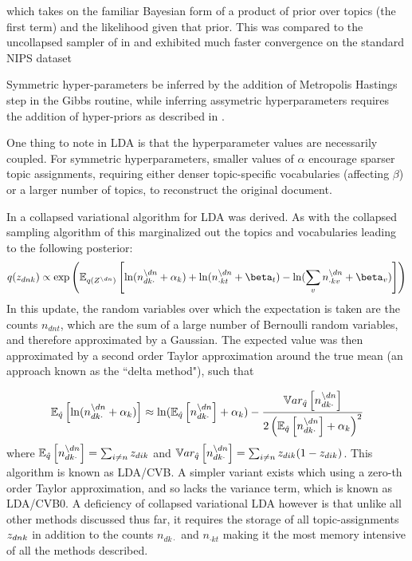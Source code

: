 which takes on the familiar Bayesian form of a product of prior over topics (the first term) and the likelihood given that prior. This was compared to the uncollapsed sampler of \cite{Pritchard2000} in and exhibited much faster convergence on the standard NIPS dataset

Symmetric hyper-parameters be inferred by the addition of Metropolis Hastings step in the Gibbs routine, while inferring assymetric hyperparameters requires the addition of hyper-priors as described in \cite{Wallach2009a}. 

One thing to note in LDA is that the hyperparameter values are necessarily coupled. For symmetric hyperparameters, smaller values of $\alpha$ encourage sparser topic assignments, requiring either denser topic-specific vocabularies (affecting $\beta$) or a larger number of topics, to reconstruct the original document.

In \cite{Teh2007} a collapsed variational algorithm for LDA was derived. As with the collapsed sampling algorithm of \cite{Griffiths2004} this marginalized out the topics and vocabularies leading to the following posterior:
\begin{equation}
q(\zdnk) \propto \exp\left(\ex{
    \ln (n_{dk\cdot}^{\setminus dn} + \alpha_k ) 
    + \ln (n_{\cdot kt}^{\setminus dn} + \beta_t)
    - \ln (\sum_v n_{\cdot kv}^{\setminus dn} + \beta_v)}{q(Z^{\setminus dn})}
\right)
\end{equation}
In this update, the random variables over which the expectation is taken are the counts $n_{dnt}$, which are the sum of a large number of Bernoulli random variables, and therefore approximated by a Gaussian. The expected value was then approximated by a second order Taylor approximation around the true mean (an approach known as the ``delta method"\cite{Wang2013}), such that

\begin{align}
\ex{\ln (n_{dk\cdot}^{\setminus dn} + \alpha_k )}{\hat{q}} 
\approx 
\ln (\ex{n_{dk\cdot}^{\setminus dn}}{\hat{q}} + \alpha_k ) - \frac{\var{n_{dk\cdot}^{\setminus dn}}{\hat{q}}}{2\left( \ex{n_{dk\cdot}^{\setminus dn}}{\hat{q}} + \alpha_k \right)^2}
\end{align}
where $\ex{n_{dk\cdot}^{\setminus dn}}{\hat{q}} = \sum_{i \neq n} z_{dik}$ and $\var{n_{dk\cdot}^{\setminus dn}}{\hat{q}} = \sum_{i \neq n} z_{dik}(1 - z_{dik})$. This algorithm is known as LDA/CVB. A simpler variant exists which using a zero-th order Taylor approximation, and so lacks the variance term, which is known as LDA/CVB0. A deficiency of collapsed variational LDA however is that unlike all other methods discussed thus far, it requires the storage of all topic-assignments $\zdnk$ in addition to the counts $n_{dk\cdot}$ and $n_{\cdot kt}$ making it the most memory intensive of all the methods described.

